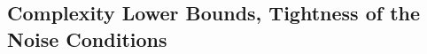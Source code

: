 \documentclass{article}
\theoremstyle{plain}
\newtheorem{lemma}[theorem]{Lemma}
\theoremstyle{definition}
\theoremstyle{remark}
\begin{document}



\subsection{Complexity Lower Bounds, Tightness of the Noise Conditions}\label{sec:napm_opt}
\end{document}
